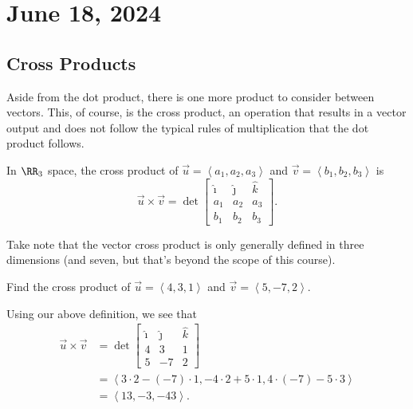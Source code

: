 \chapter{June 18, 2024}

\section{Cross Products}

Aside from the dot product, there is one more product to consider between vectors. This, of course, is the cross product, an operation that results in a vector output and does not follow the typical rules of multiplication that the dot product follows.

\begin{definition}
    In $\RR_{3}$ space, the cross product of $\vec{u} = \left<a_{1}, a_{2}, a_{3}\right>$ and $\vec{v} = \left<b_{1}, b_{2}, b_{3}\right>$ is
    \[\vec{u} \times \vec{v} = \det \begin{bmatrix} \hat{\imath} & \hat{\jmath} & \hat{k} \\ a_{1} & a_{2} & a_{3} \\ b_{1} & b_{2} & b_{3} \end{bmatrix}.\]
\end{definition}

\begin{remark}
    Take note that the vector cross product is only generally defined in three dimensions (and seven, but that's beyond the scope of this course).
\end{remark}

\begin{example}
    Find the cross product of $\vec{u} = \left<4, 3, 1\right>$ and $\vec{v} = \left<5, -7, 2\right>$.

    \begin{soln}
        Using our above definition, we see that
        \begin{align*}
            \vec{u} \times \vec{v} &= \det \begin{bmatrix}
                \hat{\imath} & \hat{\jmath} & \hat{k} \\
                4 & 3 & 1 \\
                5 & -7 & 2
            \end{bmatrix} \\
            &= \left<3 \cdot 2 - (-7) \cdot 1, -4 \cdot 2 + 5 \cdot 1, 4 \cdot (-7) - 5 \cdot 3\right> \\
            &= \left<13, -3, -43\right>.
        \end{align*}
    \end{soln}
\end{example}


